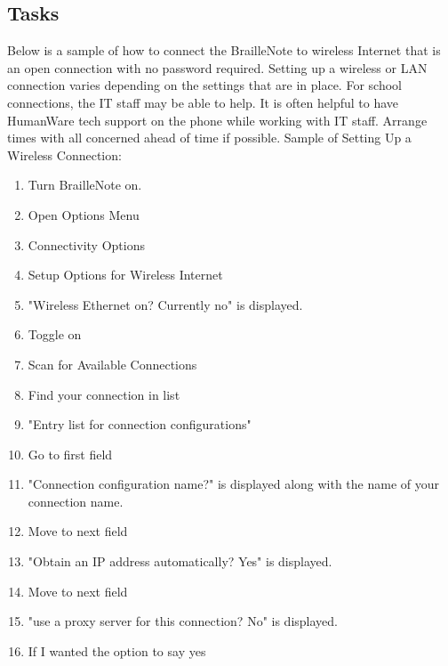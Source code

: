 \documentclass[10pt,letterpaper,twoside]{report}
\begin{document}
\subsection{Tasks}
Below is a sample of how to connect the BrailleNote to wireless Internet that is an open connection with no password required. Setting up a wireless or LAN connection varies depending on the settings that are in place. For school connections, the IT staff may be able to help. It is often helpful to have HumanWare tech support on the phone while working with IT staff. Arrange times with all concerned ahead of time if possible. 
Sample of Setting Up a Wireless Connection:
\begin{enumerate}
	\item Turn BrailleNote on.
	\item Open Options Menu 
	\item Connectivity Options 
	\item Setup Options for Wireless Internet 
	\item "Wireless Ethernet on? Currently no" is displayed.
	\item Toggle on 
	\item Scan for Available Connections 
	\item Find your connection in list 
	\item "Entry list for connection configurations"
	\item Go to first field 
	\item "Connection configuration name?" is displayed along with the name of your connection name.
	\item Move to next field 
	\item "Obtain an IP address automatically? Yes" is displayed.
	\item Move to next field 
	\item "use a proxy server for this connection? No" is displayed.
	\item If I wanted the option to say yes 

\end{enumerate}
\end{document}
